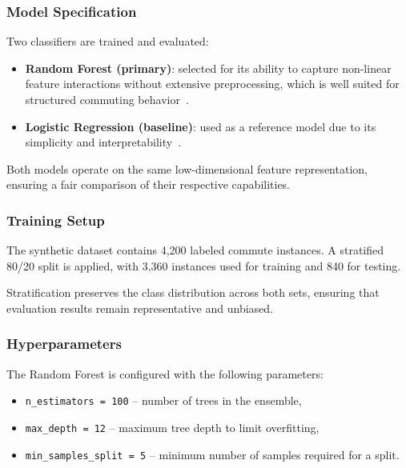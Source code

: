 \subsubsection{Model Specification}

Two classifiers are trained and evaluated:

\begin{itemize}
    \item \textbf{Random Forest (primary)}: selected for its ability to capture non-linear feature interactions without extensive preprocessing, which is well suited for structured commuting behavior~\cite{breiman2001random}.
    \item \textbf{Logistic Regression (baseline)}: used as a reference model due to its simplicity and interpretability~\cite{mitchell1997machine}.
\end{itemize}

Both models operate on the same low-dimensional feature representation, ensuring a fair comparison of their respective capabilities.

\subsubsection{Training Setup}

The synthetic dataset contains 4,200 labeled commute instances. A stratified 80/20 split is applied, with 3,360 instances used for training and 840 for testing.

Stratification preserves the class distribution across both sets, ensuring that evaluation results remain representative and unbiased.

\subsubsection{Hyperparameters}

The Random Forest is configured with the following parameters:

\begin{itemize}
    \item \texttt{n\_estimators = 100} -- number of trees in the ensemble,
    \item \texttt{max\_depth = 12} -- maximum tree depth to limit overfitting,
    \item \texttt{min\_samples\_split = 5} -- minimum number of samples required for a split.
\end{itemize}

